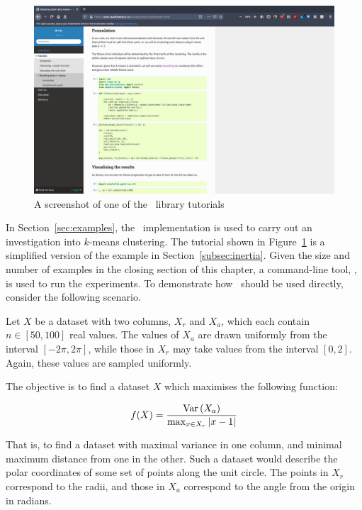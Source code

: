 \graphicspath{{./}}
\begin{figure}[htbp]
    \centering
    \includegraphics[width=\imgwidth]{img/docs.png}
    \caption{A screenshot of one of the \edo\ library tutorials}
    \label{fig:docs}
\end{figure}

In Section~\ref{sec:examples}, the \edo\ implementation is used to carry out an
investigation into \(k\)-means clustering. The tutorial shown in
Figure~\ref{fig:docs} is a simplified version of the example in
Section~\ref{subsec:inertia}. Given the size and number of examples in the
closing section of this chapter, a command-line tool, \edolab, is used to run
the experiments. To demonstrate how \edo\ should be used directly, consider the
following scenario.

Let \(X\) be a dataset with two columns, \(X_r\) and \(X_a\), which each contain
\(n \in [50, 100]\) real values. The values of \(X_a\) are drawn uniformly from
the interval \([-2\pi, 2\pi]\), while those in \(X_r\) may take values from the
interval \([0, 2]\). Again, these values are sampled uniformly.

The objective is to find a dataset \(X\) which maximises the following function:

\begin{equation}\label{eq:circle}
    f(X) = \frac{\text{Var}\left(X_{a}\right)}{%
        \max_{x \in X_r} \left|x - 1\right|%
    }
\end{equation}

That is, to find a dataset with maximal variance in one column, and minimal
maximum distance from one in the other. Such a dataset would describe the polar
coordinates of some set of points along the unit circle. The points in
\(X_r\) correspond to the radii, and those in \(X_a\) correspond to the angle
from the origin in radians.

